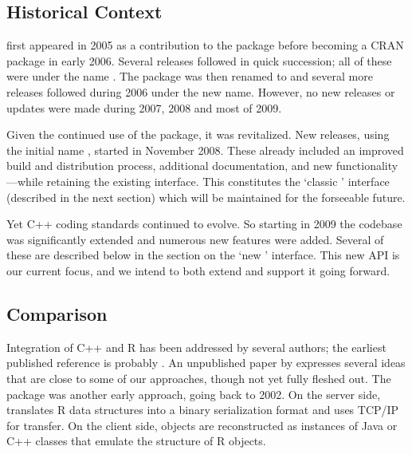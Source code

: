 \subsection{Historical Context}

 first appeared in 2005 as a contribution to the 
package \citep{eddelbuettelkhan09:rquantlib} before becoming a CRAN
package in early 2006. Several releases followed in quick succession; all of
these were under the name . The package was then renamed to
 and several more releases followed during 2006 under the
new name.  However, no new releases or updates were made during 2007, 2008
and most of 2009.

Given the continued use of the package, it was revitalized. New
releases, using the initial name , started in November 2008. These
already included an improved build and distribution process, additional
documentation, and new functionality---while retaining the existing
interface.  This constitutes the `classic ' interface (described in
the next section) which will be maintained for the forseeable future.

Yet C++ coding standards continued to evolve. So starting in 2009 the
codebase was significantly extended and numerous new features were added.
Several of these are described below in the section on the `new
' interface. This new API is our current focus, and we intend to
both extend and support it going forward.

\subsection{Comparison}

Integration of C++ and R has been addressed by several authors; the earliest
published reference is probably \cite{batesdebroy01:cppclasses}.
An unpublished paper by \cite{javagailemanly07:r_cpp} expresses several ideas
that are close to some of our approaches, though not yet fully fleshed out.
%
The  package \citep{cran:Rserve} was another early approach,
going back to 2002. On the server side,  translates R data
structures into a binary serialization format and uses TCP/IP for
transfer. On the client side, objects are reconstructed as instances of Java
or C++ classes that emulate the structure of R objects. 

